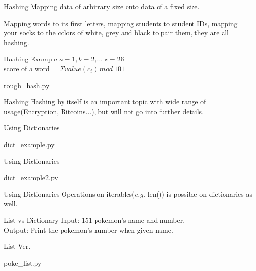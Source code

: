 \documentclass{beamer}
\begin{document}
\begin{frame}{Hashing}
  Mapping data of arbitrary size onto data of a fixed size.

  Mapping words to its first letters, mapping students to student IDs,
  mapping your socks to the colors of white, grey and black to pair them, they are all hashing.
\end{frame}

\begin{frame}{Hashing Example}
  $a=1, b=2, ...\ z=26$\\
  score of a word = $\Sigma value(c_i)\ mod\ 101$
  \begin{lstinputlisting}
    {rough_hash.py}
  \end{lstinputlisting}
\end{frame}

\begin{frame}{Hashing}
  Hashing by itself is an important topic with wide range of usage(Encryption,
  Bitcoins...), but will not go into further details.
\end{frame}

\begin{frame}{Using Dictionaries}
  \begin{lstinputlisting}
    {dict_example.py}
  \end{lstinputlisting}
\end{frame}

\begin{frame}{Using Dictionaries}
  \begin{lstinputlisting}
    {dict_example2.py}
  \end{lstinputlisting}
\end{frame}

\begin{frame}{Using Dictionaries}
  Operations on iterables(\textit{e.g.} len()) is possible on dictionaries as
  well.
\end{frame}

\begin{frame}{List vs Dictionary}
  Input: 151 pokemon's name and number.\\
  Output: Print the pokemon's number when given name.
\end{frame}

\begin{frame}{List Ver.}
  \begin{lstinputlisting}
    {poke_list.py}
  \end{lstinputlisting}
\end{frame}
\end{document}
